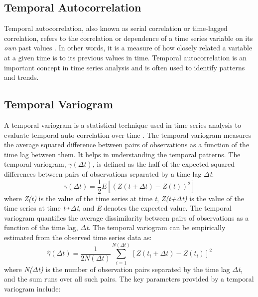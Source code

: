 \documentclass[sensors,article,submit,moreauthors,pdftex]{Definitions/mdpi}
\begin{document}
\subsection{Temporal Autocorrelation}

Temporal autocorrelation, also known as serial correlation or time-lagged correlation, refers to the correlation or dependence of a time series variable on its \textit{own} past values \citep{chatfield1989analysis, box2015time, brockwell2002introduction, shumway2017time}. In other words, it is a measure of how closely related a variable at a given time is to its previous values in time. Temporal autocorrelation is an important concept in time series analysis and is often used to identify patterns and trends.

\subsection{Temporal Variogram}

A temporal variogram is a statistical technique used in time series analysis to evaluate temporal auto-correlation over time \citep{shumway2017time, brockwell2002introduction, genton2007separable, stein2005some}. The temporal variogram measures the average squared difference between pairs of observations as a function of the time lag between them. It helps in understanding the temporal patterns. The temporal variogram, $\gamma(\Delta t)$, is defined as the half of the expected squared differences between pairs of observations separated by a time lag \textit{$\Delta$t}:
\begin{equation}
    \gamma(\Delta t)=\frac{1}{2}E\left[(Z(t+\Delta t)-Z(t))^2\right]
\end{equation}
\noindent where \textit{Z(t)} is the value of the time series at time \textit{t},  \textit{Z(t+$\Delta$t)} is the value of the time series at time \textit{t+$\Delta$t}, and \textit{E} denotes the expected value. The temporal variogram quantifies the average dissimilarity between pairs of observations as a function of the time lag, \textit{$\Delta$t}. The temporal variogram can be empirically estimated from the observed time series data as:
\begin{equation}
    \hat{\gamma}(\Delta t)=\frac{1}{2N(\Delta t)}\sum^{N(\Delta t)}_{i=1}\left[ Z(t_i+\Delta t)-Z(t_i) \right]^2
\end{equation}
where \textit{N($\Delta$t)} is the number of observation pairs separated by the time lag \textit{$\Delta$t}, and the sum runs over all such pairs. The key parameters provided by a temporal variogram include:
\end{document}
